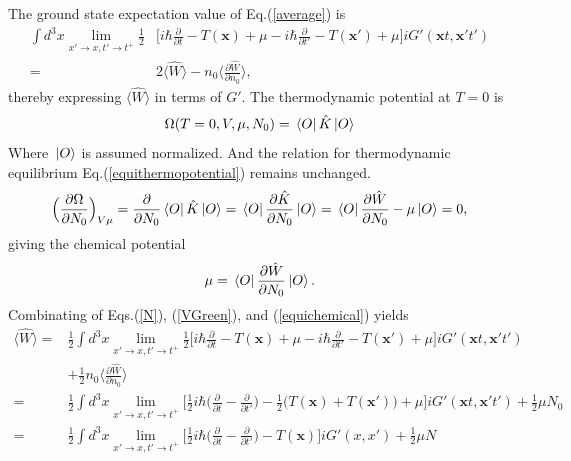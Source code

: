 \documentclass[12pt]{article}
\begin{document}
The ground state expectation value of Eq.(\ref{average}) is 
\begin{equation}\label{VGreen}
    \begin{split}
        \int d^3x\lim _{x'\rightarrow x,t'\rightarrow t^+}\frac{1}{2}&\Big[i
        \hbar\frac{\partial}{\partial t}-T(\mathbf{x})+\mu-i\hbar\frac{\partial}
        {\partial t'}-T(\mathbf{x}')+\mu\Big]iG'(\mathbf{x}t,\mathbf{x}'t')\\
        =&2\langle\hat{W}\rangle-n_0\bigg\langle\frac{\partial\hat{W}}{\partial n_0}
        \bigg\rangle,
        \end{split}
\end{equation}
thereby expressing $\langle\hat{W}\rangle$ in terms of $G'$. The thermodynamic 
potential at $T=0$ is 
\begin{equation}
    \Omega(T=0,V,\mu,N_0)=\bra*{O}\hat{K}\ket*{O}
\end{equation}
Where $\ket*{O}$ is assumed normalized. And the relation for thermodynamic equilibrium 
Eq.(\ref{equithermopotential}) remains unchanged.
\begin{equation}
    \Big(\frac{\partial\Omega}{\partial N_0}\Big)_{V\mu}=\frac{\partial}
    {\partial N_0}\bra*{O}\hat{K}\ket*{O}=\bra*{O}\frac{\partial \hat{K}}{\partial
    N_0}\ket*{O}=\bra*{O}\frac{\partial \hat{W}}{\partial N_0}-\mu\ket*{O}=0,
\end{equation}
giving the chemical potential 
\begin{equation}\label{equichemical}
    \mu=\bra*{O}\frac{\partial \hat{W}}{\partial N_0}\ket*{O}.
\end{equation}
Combinating of Eqs.(\ref{N}), (\ref{VGreen}), and (\ref{equichemical}) yields
\begin{equation}
    \begin{split}
        \langle\hat{W}\rangle=&\frac{1}{2}\int d^3x\lim _{x'\rightarrow x,t'
        \rightarrow t^+}\frac{1}{2}\Big[i\hbar\frac{\partial}{\partial t}-T
        (\mathbf{x})+\mu-i\hbar\frac{\partial}{\partial t'}-T(\mathbf{x}')+\mu\Big]
        iG'(\mathbf{x}t,\mathbf{x}'t')\\
        &+\frac{1}{2}n_0\Big\langle\frac{\partial\hat{W}}{\partial n_0}\Big\rangle\\
        =&\frac{1}{2}\int d^3x\lim _{x'\rightarrow x,t'\rightarrow t^+}\Big[\frac{1}
        {2}i\hbar\Big(\frac{\partial}{\partial t}-\frac{\partial}{\partial t'}\Big)-
        \frac{1}{2}\big(T(\mathbf{x})+T(\mathbf{x}')\big)+\mu\Big]iG'(\mathbf{x}t,
        \mathbf{x}'t')+\frac{1}{2}\mu N_0\\
        =&\frac{1}{2}\int d^3x\lim _{x'\rightarrow x,t'\rightarrow t^+}\Big[\frac{1}
        {2}i\hbar\Big(\frac{\partial}{\partial t}-\frac{\partial}{\partial t'}\Big)-
        T(\mathbf{x})\Big]iG'(x,x')+\frac{1}{2}\mu N
    \end{split}
\end{equation}
\end{document}
